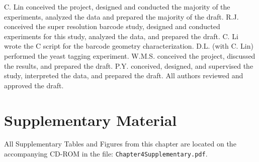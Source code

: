 C. Lin conceived the project, designed and conducted the majority of the experiments, 
analyzed the data and prepared the majority of the draft. R.J. conceived the super 
resolution barcode study, designed and conducted experiments for this study, analyzed 
the data, and prepared the draft. C. Li wrote the C script for the barcode 
geometry characterization. D.L. (with C. Lin) performed the yeast tagging experiment. 
W.M.S. conceived the project, discussed the results, and prepared the draft. P.Y. 
conceived, designed, and supervised the study, interpreted the data, and prepared the 
draft. All authors reviewed and approved the draft. 


\section{Supplementary Material}
 All Supplementary Tables and Figures from this chapter are located on the accompanying CD-ROM in the file: \texttt{Chapter4Supplementary.pdf}. 